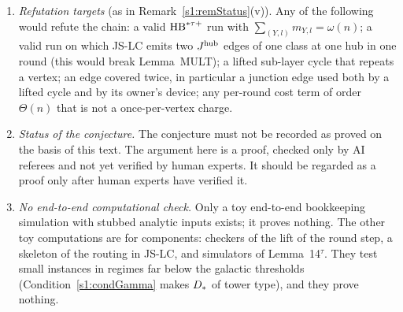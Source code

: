 \begin{enumerate}
and the proof of the stated form written out after the citation has had no
referee yet.
\item \emph{Refutation targets} (as in Remark~\ref{s1:remStatus}(v)). Any of the
following would refute the chain:
a valid $\mathrm{HB}^{*\tau{+}}$ run with $\sum_{(Y,l)}m_{Y,l}=\omega(n)$;
a valid run on which JS-LC emits two $J^{\mathrm{hub}}$ edges of one class at one hub in one
round (this would break Lemma~MULT);
a lifted sub-layer cycle that repeats a vertex;
an edge covered twice, in particular a junction edge used both by a lifted cycle
and by its owner's device;
any per-round cost term of order $\Theta(n)$ that is not a once-per-vertex
charge.
\item \emph{Status of the conjecture.} The \EG{} conjecture must not be recorded
as proved on the basis of this text. The argument here is a \candidate{} proof,
checked only by AI referees and not yet verified by human experts. It should be
regarded as a proof only after human experts have verified it.
\item \emph{No end-to-end computational check.} Only a toy end-to-end
bookkeeping simulation with stubbed analytic inputs exists; it proves nothing.
The other toy computations are for components: checkers of the
lift of the round step, a skeleton of the routing in JS-LC, and simulators of
Lemma~14$^\tau$. They test small instances in regimes far below the galactic
thresholds (Condition~\ref{s1:condGamma} makes $D_{*}$ of tower type), and they prove nothing.
\end{enumerate}
